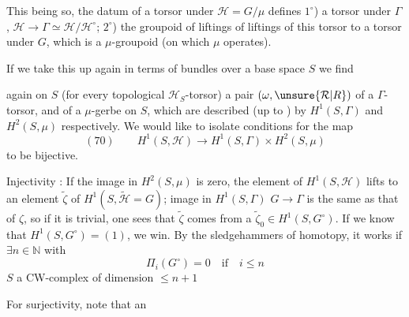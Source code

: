 This being so, the datum of a torsor under
$\mathcal H=G/\mu$ defines $1^\circ$) a torsor under $\Gamma$,
$\mathcal H\longrightarrow\Gamma\simeq\mathcal H/\mathcal H^\circ$; $2^\circ$) the groupoid of
liftings of liftings of this torsor
to a torsor under $G$, which is a
 $\mu$-groupoid (on which $\mu$ operates).

If we  take this up again in terms of bundles
over a base space $S$ we find

again on $S$ (for every topological $\mathcal H_S$-torsor)
a pair $(\omega,\unsure{\mathcal R|R})$ of a $\Gamma$-torsor, and of
a $\mu$-gerbe on $S$, which are described (up to 
) by $H^1(S,\Gamma)$ and $H^2(S,\mu)$
respectively. We would like to isolate
conditions  for the map
\[
(70)\qquad H^1(S,\mathcal H)\longrightarrow H^1(S,\Gamma)\times H^2(S,\mu)
\]
to be bijective.

Injectivity : If the image 
in $H^2(S,\mu)$ is zero,
the element of $H^1(S,\mathcal H)$ lifts to an element $\widetilde\zeta$
of $H^1(S,\widetilde{\mathcal H}=G)$;  image in $H^1(S,\Gamma)$
 $G\longrightarrow\Gamma$ is the same as that of $\zeta$, so if
it is trivial, one sees that $\widetilde\zeta$ comes from
a $\widetilde\zeta_0\in H^1(S,G^\circ)$. If we know that
$H^1(S,G^\circ)=(1)$, we win. By the
sledgehammers of homotopy, it works
if $\exists n\in\mathbb N$ with
\[
\Pi_i(G^\circ)=0\quad\text{if}\quad i\leq n
\]
$S$ a CW-complex of dimension $\leq n+1$

For surjectivity, note that  an

